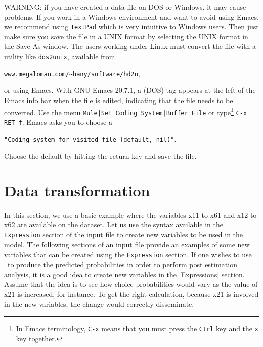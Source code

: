 \documentclass[12pt]{memoir}
\begin{document}
   WARNING: if you have created a data file on DOS or Windows, it may
   cause problems. If you work in a Windows environment and want to avoid 
   using Emacs, we recommend using \texttt{TextPad} 
   which is very intuitive to Windows users. Then just make sure you save the file in a 
   UNIX format by selecting the UNIX format in the Save As window. 
   The users working under Linux must convert
   the file with a utility like 
   \texttt{dos2unix},
   available from
   \begin{center}
   \texttt{www.megaloman.com/\~{}hany/software/hd2u},
   \end{center}
   or using Emacs. With GNU Emacs 20.7.1, a (DOS) tag appears at the left
   of the Emacs info bar when the file is edited, indicating that the
   file needs to be converted. Use the menu
   \verb+Mule|Set Coding System|Buffer File+ or type\footnote{In Emacs
     terminology, \texttt{C-x}
    means that you must press the \texttt{Ctrl} key
   and the \texttt{x} key together.}
   \verb+C-x RET f+. Emacs asks you to choose a
   \begin{center}
   \verb+"Coding system for visited file (default, nil)"+.
   \end{center} 
   Choose the
   default by hitting the return key and save the file.



\section{Data transformation}
\label{sec:transfdata}

   In this section, we use a basic example where the variables x11 to x61 and x12 to x62
   are available on the dataset.  Let us use the syntax available in the \verb+Expression+ section of 
   the input file to create new variables to be used in the model. The following sections of an input file 
   provide an examples of some new variables that can be created using the \verb+Expression+ section.
   If one wishes to use \BIOSIM\ to produce the predicted probabilities in order to perform post 
   estimation analysis, it is a good idea to create new variables in the \hyperlink{Expressions}{[Expressions]} 
   section. Assume that the idea is to see how choice probabilities would vary as the value of x21 is increased, 
   for instance.  To get the right calculation, because x21 is involved in the new variables, 
   the change would correctly disseminate.
   
\end{document}

